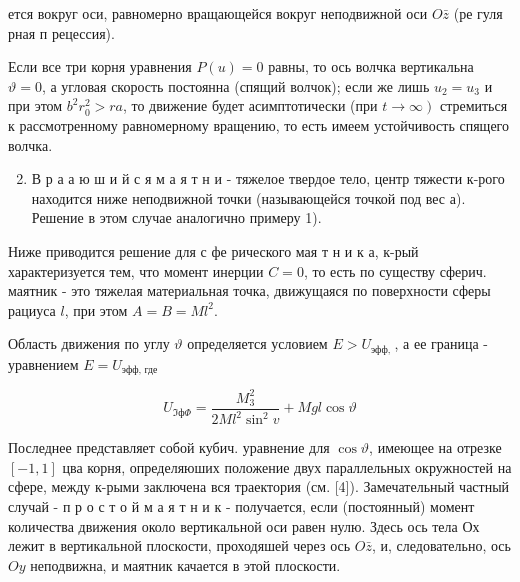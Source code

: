 \documentclass[10pt]{article}
\begin{document}
ется вокруг оси, равномерно вращающейся вокруг неподвижной оси $O \bar{z}$ (ре гуля рная п рецессия).



Если все три корня уравнения $P(u)=0$ равны, то ось волчка вертикальна $\vartheta=0$, а угловая скорость постоянна (спящий волчок); если же лишь $u_{2}=u_{3}$ и при этом $b^{2} r_{0}^{2}>r a$, то движение будет асимптотически (при $\left.t \rightarrow \infty\right)$ стремиться к рассмотренному равномерному вращению, то есть имеем устойчивость спящего волчка.



\begin{enumerate}

  \setcounter{enumi}{1}

  \item В р а а ю ш и й с я м а я т н и - тяжелое твердое тело, центр тяжести к-рого находится ниже неподвижной точки (называющейся точкой под вес а). Решение в этом случае аналогично примеру 1).

\end{enumerate}



Ниже приводится решение для с фе рического мая т н и к а, к-рый характеризуется тем, что момент инерции $C=0$, то есть по существу сферич. маятник - это тяжелая материальная точка, движущаяся по поверхности сферы рациуса $l$, при этом $A=B=M l^{2}$.



Область движения по углу $\vartheta$ определяется условием $E>U_{\text {эфф, }}$, а ее граница - уравнением $E=U_{\text {эфф, где }}$



\[

U_{\Im ф \Phi}=\frac{M_{3}^{2}}{2 M l^{2} \sin ^{2} v}+M g l \cos \vartheta

\]



Последнее представляет собой кубич. уравнение для $\cos \vartheta$, имеющее на отрезке $[-1,1]$ цва корня, определяюших положение двух параллельных окружностей на сфере, между к-рыми заключена вся траектория (см. [4]). Замечательный частный случай - п р о с т о й м а я т н и к - получается, если (постоянный) момент количества движения около вертикальной оси равен нулю. Здесь ось тела $О х$ лежит в вертикальной плоскости, проходяшей через ось $O \bar{z}$, и, следовательно, ось $O y$ неподвижна, и маятник качается в этой плоскости.
\end{document}
